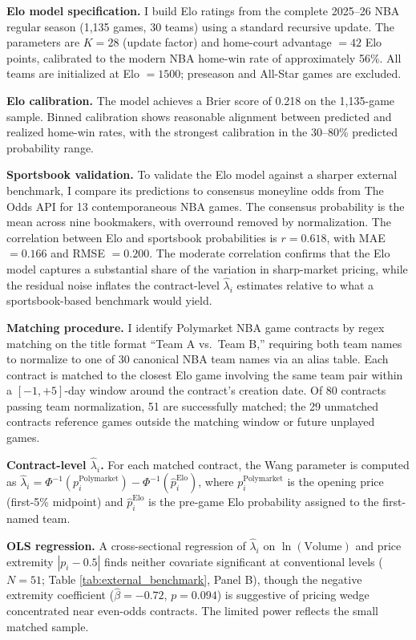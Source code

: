 \documentclass[12pt,a4paper]{article}
\begin{document}
\textbf{Elo model specification.} I build Elo ratings from the complete
2025--26 NBA regular season (1,135 games, 30 teams) using a standard
recursive update. The parameters are \(K = 28\) (update factor) and
home-court advantage \(= 42\) Elo points, calibrated to the modern NBA
home-win rate of approximately 56\%. All teams are initialized at Elo
\(= 1500\); preseason and All-Star games are excluded.

\textbf{Elo calibration.} The model achieves a Brier score of 0.218 on
the 1,135-game sample. Binned calibration shows reasonable alignment
between predicted and realized home-win rates, with the strongest
calibration in the 30--80\% predicted probability range.

\textbf{Sportsbook validation.} To validate the Elo model against a
sharper external benchmark, I compare its predictions to consensus
moneyline odds from The Odds API for 13 contemporaneous NBA games. The
consensus probability is the mean across nine bookmakers, with overround
removed by normalization. The correlation between Elo and sportsbook
probabilities is \(r = 0.618\), with MAE \(= 0.166\) and RMSE
\(= 0.200\). The moderate correlation confirms that the Elo model
captures a substantial share of the variation in sharp-market pricing,
while the residual noise inflates the contract-level \(\hat{\lambda}_i\)
estimates relative to what a sportsbook-based benchmark would yield.

\textbf{Matching procedure.} I identify Polymarket NBA game contracts by
regex matching on the title format ``Team A vs.~Team B,'' requiring
both team names to normalize to one of 30 canonical NBA team names via
an alias table. Each contract is matched to the closest Elo game
involving the same team pair within a \([-1, +5]\)-day window around the
contract's creation date. Of 80 contracts passing team normalization, 51
are successfully matched; the 29 unmatched contracts reference games
outside the matching window or future unplayed games.

\textbf{Contract-level \(\hat{\lambda}_i\).} For each matched contract,
the Wang parameter is computed as
\(\hat{\lambda}_i = \Phi^{-1}(p_i^{\text{Polymarket}}) - \Phi^{-1}(\hat{p}_i^{\text{Elo}})\),
where \(p_i^{\text{Polymarket}}\) is the opening price (first-5\%
midpoint) and \(\hat{p}_i^{\text{Elo}}\) is the pre-game Elo probability
assigned to the first-named team.

\textbf{OLS regression.} A cross-sectional regression of
\(\hat{\lambda}_i\) on \(\ln(\text{Volume})\) and price extremity
\(|p_i - 0.5|\) finds neither covariate significant at conventional
levels (\(N = 51\); Table \ref{tab:external_benchmark}, Panel B), though
the negative extremity coefficient (\(\hat{\beta} = -0.72\),
\(p = 0.094\)) is suggestive of pricing wedge concentrated near
even-odds contracts. The limited power reflects the small matched
sample.
\end{document}
